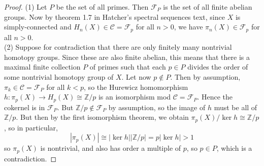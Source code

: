 \documentclass[reqno]{amsart}
\theoremstyle{definition}
\theoremstyle{remark}
\begin{document}
    \begin{proof}
        (1) Let $P$ be the set of all primes.
        Then $\mathcal{F}_P$ is the set of all
        finite abelian groups.
        Now by theorem 1.7 in Hatcher's spectral sequences text,
        since $X$ is simply-connected and
        $H_n(X) \in \mathcal{C} = \mathcal{F}_p$ for all
        $n>0$, we have $\pi_n(X) \in \mathcal{F}_p$ for all
        $n>0$.\\
        \linebreak
        (2) Suppose for contradiction that
        there are only finitely many nontrivial homotopy
        groups. Since these are also finite abelian, this
        means that there is a maximal finite collection $P$ of primes
        such that each $p \in P$ divides the order of some
        nontrivial homotopy group of $X$.
        Let now $p \not\in P$. Then
        by assumption,
        $\pi_k \in \mathcal{C} = \mathcal{F}_P$ for
        all $k < p$, so
        the Hurewicz homomorphism
        $h \colon \pi_p (X) \to H_p(X) \cong \mathbb{Z} / p$ is
        an isomorphism mod $\mathcal{C} = \mathcal{F}_P$.
        Hence the cokernel is in $\mathcal{F}_P$. But
        $\mathbb{Z} / p \not\in \mathcal{F}_P$ by assumption, so
        the image of $h$ must be all of $\mathbb{Z} / p$.
        But then by the first isomorphism theorem, we obtain
        $\pi_p(X) / \ker h \cong \mathbb{Z} / p$, so in particular,
        \[
        \left| \pi_p(X) \right| \cong 
        \left| \ker h \right| \left| \mathbb{Z}/p \right| 
        = p \left| \ker h \right| > 1
        \] 
        so $\pi_p (X)$ is nontrivial, and also has
        order a multiple of $p$, so
        $p \in P$, which is a contradiction.



        

    \end{proof}
\end{document}
